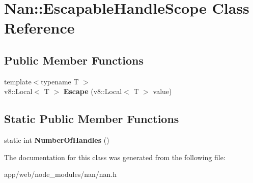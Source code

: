 \hypertarget{class_nan_1_1_escapable_handle_scope}{}\section{Nan\+:\+:Escapable\+Handle\+Scope Class Reference}
\label{class_nan_1_1_escapable_handle_scope}
\subsection*{Public Member Functions}
\begin{DoxyCompactItemize}
\item 
\mbox{\label{class_nan_1_1_escapable_handle_scope_a0224e818edc0daf861f8903d3b8fc25c}} 
{\footnotesize template$<$typename T $>$ }\\v8\+::\+Local$<$ T $>$ {\bfseries Escape} (v8\+::\+Local$<$ T $>$ value)
\end{DoxyCompactItemize}
\subsection*{Static Public Member Functions}
\begin{DoxyCompactItemize}
\item 
\mbox{\label{class_nan_1_1_escapable_handle_scope_a92555ac16cfcbd54c67e76e0e2853c7e}} 
static int {\bfseries Number\+Of\+Handles} ()
\end{DoxyCompactItemize}


The documentation for this class was generated from the following file\+:\begin{DoxyCompactItemize}
\item 
app/web/node\+\_\+modules/nan/nan.\+h\end{DoxyCompactItemize}
